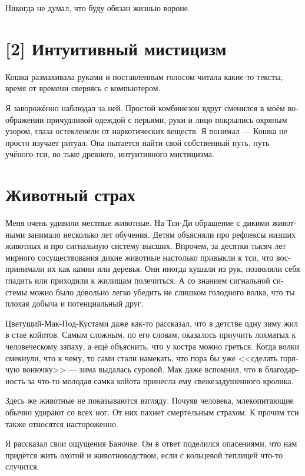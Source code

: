\documentclass[a4paper,12pt,fleqn]{book}\usepackage{polyglossia}\setdefaultlanguage[babelshorthands=true]{russian}\setotherlanguage{english}\defaultfontfeatures{Ligatures=TeX,Mapping=tex-text}\usepackage{xcolor}\newcommand{\ml}[3]{#2}
\begin{document}
{Никогда не думал, что буду обязан жизнью вороне.

\section{[2] Интуитивный мистицизм}

Кошка размахивала руками и поставленным голосом читала какие-то тексты, время от времени сверяясь с компьютером.

Я заворожённо наблюдал за ней.
Простой комбинезон вдруг сменился в моём воображении причудливой одеждой с перьями, руки и лицо покрылись охряным узором, глаза остекленели от наркотических веществ.
Я понимал --- Кошка не просто изучает ритуал.
Она пытается найти свой собственный путь, путь учёного-тси, во тьме древнего, интуитивного мистицизма.

\section{Животный страх}

Меня очень удивили местные животные.
На Тси-Ди обращение с дикими животными занимало несколько лет обучения.
Детям объясняли про рефлексы низших животных и про сигнальную систему высших.
Впрочем, за десятки тысяч лет мирного сосуществования дикие животные настолько привыкли к тси, что воспринимали их как камни или деревья.
Они иногда кушали из рук, позволяли себя гладить или приходили к жилищам полечиться.
А со знанием сигнальной системы можно было довольно легко убедить не слишком голодного волка, что ты плохая добыча и потенциальный друг.

Цветущий-Мак-Под-Кустами даже как-то рассказал, что в детстве одну зиму жил в стае койотов.
Самым сложным, по его словам, оказалось приучить лохматых к человеческому запаху, а ещё объяснить, что у костра можно греться.
Когда волки смекнули, что к чему, то сами стали намекать, что пора бы уже <<сделать горячую вонючку>> --- зима выдалась суровой.
Мак даже вспомнил, что в благодарность за что-то молодая самка койота принесла ему свежезадушенного кролика.

Здесь же животные не показываются взгляду.
Почуяв человека, млекопитающие обычно удирают со всех ног.
От них пахнет смертельным страхом.
К прочим тси также относятся настороженно.

Я рассказал свои ощущения Баночке.
Он в ответ поделился опасениями, что нам придётся жить охотой и животноводством, если с кольцевой теплицей что-то случится.

}
\end{document}
